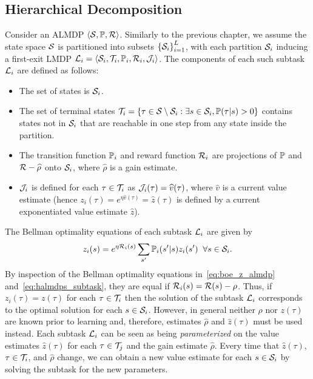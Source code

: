 \subsection{Hierarchical Decomposition}
Consider an ALMDP $\langle\mathcal{S},\mathbb{P},\mathcal{R}\rangle$. Similarly to the previous chapter, we assume the state space $\mathcal{S}$ is partitioned into subsets $\left\{\mathcal{S}_i\right\}^L_{i=1}$, with each partition $\mathcal{S}_i$ inducing
a first-exit LMDP $\mathcal{L}_i = \langle\mathcal{S}_i, \mathcal{T}_i, \mathbb{P}_i, \mathcal{R}_i,\mathcal{J}_i\rangle$.
The components of each such subtask $\mathcal{L}_i$ are defined as follows:
\begin{itemize}
  \item The set of states is $\mathcal{S}_i$.
  \item The set of terminal states $\mathcal{T}_i=\{\tau\in\mathcal{S}\setminus\mathcal{S}_i: \exists s\in\mathcal{S}_i, \mathbb{P}(\tau|s)>0\}$ contains states not in $\mathcal{S}_i$ that are reachable in one step from any state inside the partition.
  \item The transition function $\mathbb{P}_i$ and reward function $\mathcal{R}_i$ are projections of $\mathbb{P}$ and $\mathcal{R}-\widehat\rho$ onto $\mathcal{S}_i$, where $\widehat\rho$ is a gain estimate.
  \item $\mathcal{J}_i$ is defined for each $\tau\in\mathcal{T}_i$ as $\mathcal{J}_i(\tau)=\widehat v(\tau)$, where $\widehat v$ is a current value estimate (hence $z_i(\tau)=e^{\eta\widehat v(\tau)} = \widehat z(\tau)$ is defined by a current exponentiated value estimate $\widehat z$).
\end{itemize}
The Bellman optimality equations of each subtask $\mathcal{L}_i$ are given by
\begin{equation}\label{eq:halmdps_subtask}
  z_i(s) = e^{\eta \mathcal{R}_i(s)} \sum_{s'} \mathbb{P}_i(s'|s) z_i(s') \;\; \forall s\in\mathcal{S}_i.
\end{equation}
By inspection of the Bellman optimality equations in~\eqref{eq:boe_z_almdp} and~\eqref{eq:halmdps_subtask}, they are equal if $\mathcal{R}_i(s)=\mathcal{R}(s)-\rho$. Thus, if $z_i(\tau)=z(\tau)$ for each $\tau\in\mathcal{T}_i$ then the solution of the subtask $\mathcal{L}_i$ corresponds to the optimal solution for each $s\in\mathcal{S}_i$. However, in general neither $\rho$ nor $z(\tau)$ are known prior to learning and, therefore, estimates $\widehat\rho$ and $\widehat z(\tau)$ must be used instead. Each subtask $\mathcal{L}_i$ can be seen as being {\it parameterized\/} on the value estimates $\widehat z(\tau)$ for each $\tau\in\mathcal{T}_j$ and the gain estimate $\widehat\rho$. Every time that $\widehat z(\tau)$, $\tau\in\mathcal{T}_i$, and $\widehat\rho$ change, we can obtain a new value estimate for each $s\in\mathcal{S}_i$ by solving the subtask for the new parameters.

